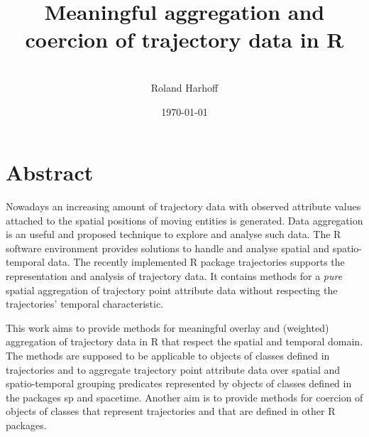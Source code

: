 \documentclass[12pt, oneside, a4paper]{scrbook}
\newcommand{\pkg}[1]{{\normalfont\fontseries{b}\selectfont #1}}
\let\proglang=\textsf
\begin{document}




\title{Meaningful aggregation and \\ coercion of trajectory data in \proglang{R}}
\subtitle{}
\author{\\ Roland Harhoff \\}
\date{\today}

\maketitle


\frontmatter

\chapter{Abstract}

Nowadays an increasing amount of trajectory data with observed attribute values attached to the spatial positions of moving entities is generated.
Data aggregation is an useful and proposed technique to explore and analyse such data.
The \proglang{R} software environment provides solutions to handle and analyse spatial and spatio-temporal data.
The recently implemented \proglang{R} package \pkg{trajectories} supports the representation and analysis of trajectory data. 
It contains methods for a \textit{pure} spatial aggregation of trajectory point attribute data without respecting the trajectories' temporal characteristic.

This work aims to provide methods for meaningful overlay and (weighted) aggregation of trajectory data in \proglang{R} that respect the spatial and temporal domain.
The methods are supposed to be applicable to objects of classes defined in \pkg{trajectories} and to aggregate trajectory point attribute data over spatial and spatio-temporal grouping predicates represented by objects of classes defined in the packages \pkg{sp} and \pkg{spacetime}. 
Another aim is to provide methods for coercion of objects of classes that represent trajectories and that are defined in other \proglang{R} packages.
\end{document}
